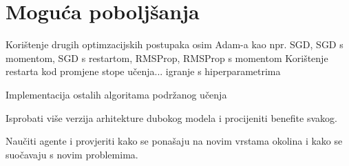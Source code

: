 \chapter{Moguća poboljšanja}

Korištenje drugih optimzacijskih postupaka osim Adam-a kao npr. SGD, SGD s momentom, SGD s restartom, RMSProp, RMSProp s momentom
Korištenje restarta kod promjene stope učenja... igranje s hiperparametrima

Implementacija ostalih algoritama podržanog učenja

Isprobati više verzija arhitekture dubokog modela i procijeniti benefite svakog.

Naučiti agente i provjeriti kako se ponašaju na novim vrstama okolina i kako se suočavaju s novim problemima.


